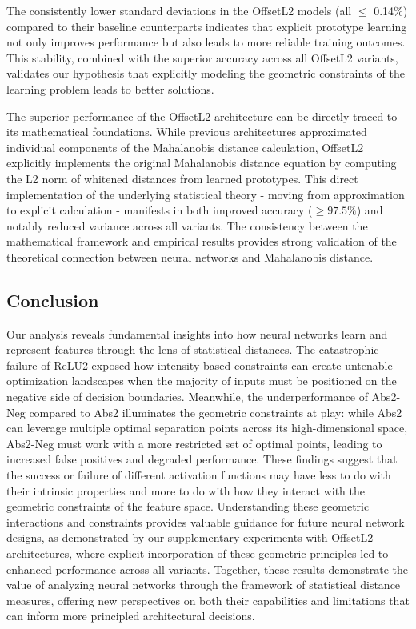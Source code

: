The consistently lower standard deviations in the OffsetL2 models (all $\leq$ 0.14\%) compared to their baseline counterparts indicates that explicit prototype learning not only improves performance but also leads to more reliable training outcomes. This stability, combined with the superior accuracy across all OffsetL2 variants, validates our hypothesis that explicitly modeling the geometric constraints of the learning problem leads to better solutions.

The superior performance of the OffsetL2 architecture can be directly traced to its mathematical foundations. While previous architectures approximated individual components of the Mahalanobis distance calculation, OffsetL2 explicitly implements the original Mahalanobis distance equation by computing the L2 norm of whitened distances from learned prototypes. This direct implementation of the underlying statistical theory - moving from approximation to explicit calculation - manifests in both improved accuracy ($\geq97.5\%$) and notably reduced variance across all variants. The consistency between the mathematical framework and empirical results provides strong validation of the theoretical connection between neural networks and Mahalanobis distance.

\subsection{Conclusion}

Our analysis reveals fundamental insights into how neural networks learn and represent features through the lens of statistical distances. The catastrophic failure of ReLU2 exposed how intensity-based constraints can create untenable optimization landscapes when the majority of inputs must be positioned on the negative side of decision boundaries. Meanwhile, the underperformance of Abs2-Neg compared to Abs2 illuminates the geometric constraints at play: while Abs2 can leverage multiple optimal separation points across its high-dimensional space, Abs2-Neg must work with a more restricted set of optimal points, leading to increased false positives and degraded performance. These findings suggest that the success or failure of different activation functions may have less to do with their intrinsic properties and more to do with how they interact with the geometric constraints of the feature space. Understanding these geometric interactions and constraints provides valuable guidance for future neural network designs, as demonstrated by our supplementary experiments with OffsetL2 architectures, where explicit incorporation of these geometric principles led to enhanced performance across all variants. Together, these results demonstrate the value of analyzing neural networks through the framework of statistical distance measures, offering new perspectives on both their capabilities and limitations that can inform more principled architectural decisions.